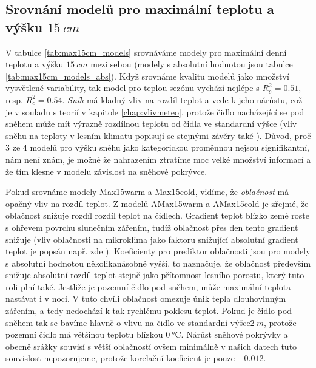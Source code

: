 \subsection{Srovnání modelů pro maximální teplotu a výšku $\SI{15}{cm}$}
V tabulce \ref{tab:max15cm_models} srovnáváme modely pro maximální denní teplotu a výšku $\SI{15}{cm}$ mezi sebou (modely s absolutní hodnotou jsou tabulce \ref{tab:max15cm_models_abs}). Když srovnáme kvalitu modelů jako množství vysvětlené variability, tak model pro teplou sezónu vychází nejlépe s $R_c^2 = 0.51$, resp. $R_c^2 = 0.54$. \textit{Sníh} má kladný vliv na rozdíl teplot a vede k jeho nárůstu, což je v souladu s teorií v kapitole \ref{chap:vlivmeteo}, protože čidlo nacházející se pod sněhem může mít výrazně rozdílnou teplotu od čidla ve standardní výšce (vliv sněhu na teploty v lesním klimatu popisují se stejnými závěry také \parencite{snow_deFrenneForestMicroclimates}). Důvod, proč 3 ze 4 modelů pro výšku sněhu jako kategorickou proměnnou nejsou signifikantní, nám není znám, je možné že nahrazením ztratíme moc velké množství informací a že tím klesne v modelu závislost na sněhové pokrývce.

Pokud srovnáme modely Max15warm a Max15cold, vidíme, že \textit{oblačnost} má opačný vliv na rozdíl teplot. Z modelů AMax15warm a AMax15cold je zřejmé, že oblačnost snižuje rozdíl rozdíl teplot na čidlech. Gradient teplot blízko země roste s ohřevem povrchu slunečním zářením, tudíž oblačnost přes den tento gradient snižuje (vliv oblačnosti na mikroklima jako faktoru snižující absolutní gradient teplot je popsán např. zde \parencite{snow_deFrenneForestMicroclimates, cloud_overwinteringclusters}). Koeficienty pro prediktor oblačnosti jsou pro modely s absolutní hodnotou několikanásobně vyšší, to naznačuje, že oblačnost především snižuje absolutní rozdíl teplot stejně jako přítomnost lesního porostu, který tuto roli plní také. Jestliže je pozemní čidlo pod sněhem, může maximální teplota nastávat i v noci. V tuto chvíli oblačnost omezuje únik tepla dlouhovlnným zářením, a tedy nedochází k tak rychlému poklesu teplot. Pokud je čidlo pod sněhem tak se bavíme hlavně o vlivu na čidlo ve standardní výšce$\SI{2}{m}$, protože pozemní čidlo má většinou teplotu blízkou $\SI{0}{\celsius}$. Nárůst sněhové pokrývky a obecně srážky souvisí s větší oblačností ovšem minimálně v našich datech tuto souvislost nepozorujeme, protože korelační koeficient je pouze $-0.012$.

